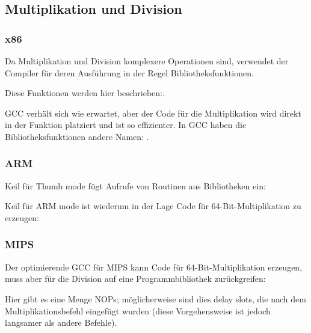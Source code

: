 \subsection{Multiplikation und Division}



\subsubsection{x86}


Da Multiplikation und Division komplexere Operationen sind, verwendet der Compiler für deren Ausführung in der Regel
Bibliotheksfunktionen.

Diese Funktionen werden hier beschrieben:.


GCC verhält sich wie erwartet, aber der Code für die Multiplikation wird direkt in der Funktion platziert und ist so
effizienter. In GCC haben die Bibliotheksfunktionen andere Namen: .

\subsubsection{ARM}
Keil für Thumb mode fügt Aufrufe von Routinen aus Bibliotheken ein:


Keil für ARM mode ist wiederum in der Lage Code für 64-Bit-Multiplikation zu erzeugen:



\subsubsection{MIPS}
Der optimierende GCC für MIPS kann Code für 64-Bit-Multiplikation erzeugen, muss aber für die Division auf eine
Programmbibliothek zurückgreifen:


Hier gibt es eine Menge \ac{NOP}s; möglicherweise sind dies delay slots, die nach dem Multiplikationsbefehl eingefügt
wurden (diese Vorgehensweise ist jedoch langsamer als andere Befehle).

